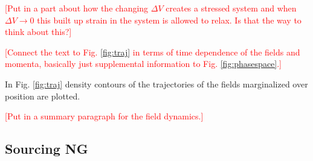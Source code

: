\textcolor{red}{[Put in a part about how the changing $\Delta V$ creates a stressed system and when $\Delta V \to 0$ this built up strain in the system is allowed to relax. Is that the way to think about this?]}

\Fphasespace


\textcolor{red}{[Connect the text to Fig. \ref{fig:traj} in terms of time dependence of the fields and momenta, basically just supplemental information to Fig. \ref{fig:phasespace}.]}

In Fig. \ref{fig:traj} density contours of the trajectories of the fields marginalized over position are plotted.  

\Ftraj

\textcolor{red}{[Put in a summary paragraph for the field dynamics.]}




\subsection{Sourcing NG} \label{sec:zeta production}


